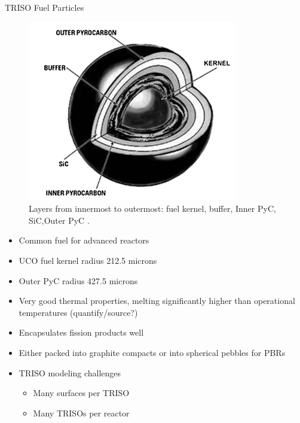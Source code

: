 \documentclass[9pt,t,aspectratio=169]{beamer}
\begin{document}
\begin{frame}{TRISO Fuel Particles}
    \begin{minipage}[t]{0.45\linewidth}
        \begin{figure}
            \centering
            \includegraphics[width=0.9\linewidth]{figures/TRISO_diagram_Zhou_Tang.png}
            \caption{Layers from innermost to outermost: fuel kernel, buffer, Inner PyC, SiC,Outer PyC \cite{zhou_tang}.}
        \end{figure}
    \end{minipage}
    \hfill%
    \begin{minipage}[t]{0.45\linewidth}
        \begin{itemize}
            \item Common fuel for advanced reactors
            \item UCO fuel kernel radius 212.5 microns
            \item Outer PyC radius 427.5 microns
            \item Very good thermal properties, melting significantly higher than operational temperatures (quantify/source?)
            \item Encapsulates fission products well
            \item Either packed into graphite compacts or into spherical pebbles for PBRs
            \item TRISO modeling challenges
            \begin{itemize}
                \item Many surfaces per TRISO
                \item Many TRISOs per reactor
            \end{itemize}
        \end{itemize}
    \end{minipage}
\end{frame}
\end{document}

